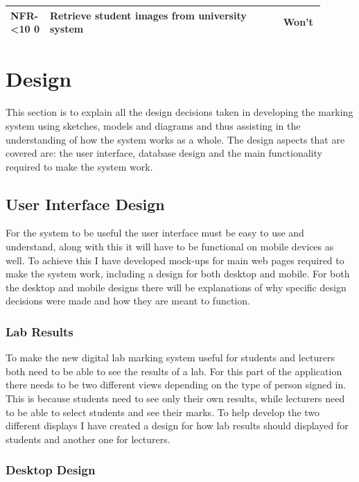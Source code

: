 \documentclass[12pt]{article}  %
\newcommand{\rid}[1]{\centering #1-\ifnum\value{requirement}<10 0\fi\arabic{requirement}
\stepcounter{requirement}}
\begin{document}
\begin{spacing}{1.5}
\begin{longtable}{|p{0.1\linewidth}|p{0.7\linewidth}|p{0.1\linewidth}|}
\rid{NFR} & Retrieve student images from university system & Won't\\ \hline

\end{longtable}
\end{spacing}
\setcounter{requirement}{1}


\newpage
\section{Design}
This section is to explain all the design decisions taken in developing the marking system using sketches, models and diagrams and thus assisting in the understanding of how the system works as a whole. The design aspects that are covered are: the user interface, database design and the main functionality required to make the system work. 

\subsection{User Interface Design}
For the system to be useful the user interface must be easy to use and understand, along with this it will have to be functional on mobile devices as well. To achieve this I have developed mock-ups for main web pages required to make the system work, including a design for both desktop and mobile. For both the desktop and mobile designs there will be explanations of why specific design decisions were made and how they are meant to function.



\subsubsection{Lab Results}
To make the new digital lab marking system useful for students and lecturers both need to be able to see the results of a lab. For this part of the application there needs to be two different views depending on the type of person signed in. This is because students need to see only their own results, while lecturers need to be able to select students and see their marks. To help develop the two different displays I have created a design for how lab results should displayed for students and another one for lecturers.

\subsubsection*{Desktop Design}
\end{document}
